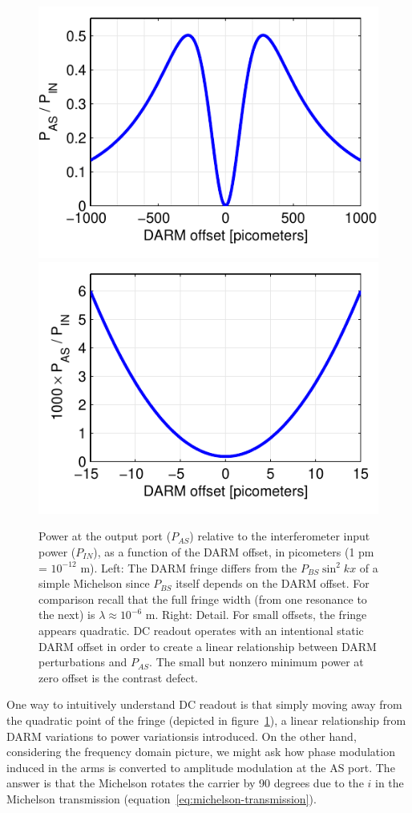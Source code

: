 \begin{figure}
\includegraphics[width=0.5\columnwidth]{figures/darmfringe-1000.pdf}
\includegraphics[width=0.5\columnwidth]{figures/darmfringe-15.pdf}
\caption[DARM fringe]{Power at the output port ($P_{AS}$) relative to
  the interferometer input power ($P_{IN}$), as a function of the DARM
  offset, in picometers (1 pm = $10^{-12}$ m).  Left: The DARM fringe
  differs from the $P_{BS} \sin^2 kx$ of a simple Michelson since
  $P_{BS}$ itself depends on the DARM offset.  For comparison recall
  that the full fringe width (from one resonance to the next) is
  $\lambda\approx10^{-6}$ m.  Right: Detail. For small offsets, the
  fringe appears quadratic.  DC readout operates with an intentional
  static DARM offset in order to create a linear relationship between
  DARM perturbations and $P_{AS}$.  The small but nonzero minimum
  power at zero offset is the contrast defect.
  \label{fig:darm-fringe}
}
\end{figure}

One way to intuitively understand DC readout is that simply moving
away from the quadratic point of the fringe (depicted in
figure~\ref{fig:darm-fringe}), a linear relationship from DARM
variations to power variationsis introduced.  On the other hand,
considering the frequency domain picture, we might ask how phase
modulation induced in the arms is converted to amplitude modulation at
the AS port.  The answer is that the Michelson rotates the carrier by
90 degrees due to the $i$ in the Michelson transmission
(equation~\ref{eq:michelson-transmission}).

